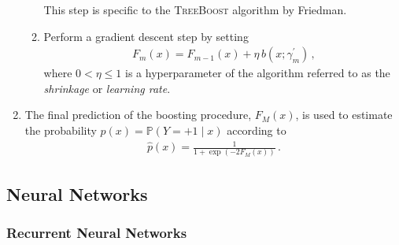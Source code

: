 \begin{enumerate}
\begin{enumerate}
    This step is specific to the \textsc{TreeBoost} algorithm by Friedman.

  \item Perform a gradient descent step by setting
    \begin{align*}
      F_m(x) = F_{m - 1}(x) + \eta \, b(x; \gamma_{m}^\prime) \,\text{,}
    \end{align*}
    where $0 < \eta \leq 1$ is a hyperparameter of the algorithm referred to as
    the \emph{shrinkage} or \emph{learning rate}.

  \end{enumerate}

\item The final prediction of the boosting procedure, $F_{M}(x)$, is used to
  estimate the probability $p(x) = \mathbb{P}(Y = +1 \mid x)$ according to
  \begin{align*}
    \hat{p}(x) = \frac{1}{1 + \exp(-2 F_{M}(x))} \,\text{.}
  \end{align*}
\end{enumerate}


\subsection{Neural Networks}

\subsubsection{Recurrent Neural Networks}%
\label{sec:rnn}


